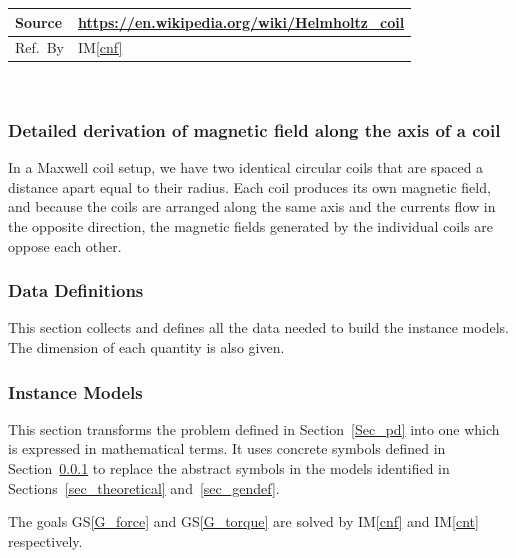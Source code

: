 \documentclass[12pt]{article}
\newcommand{\colAwidth}{0.13\textwidth}
\newcommand{\colBwidth}{0.92\textwidth}
\newcommand{\gsref}[1]{GS\ref{#1}}
\newcommand{\iref}[1]{IM\ref{#1}}
\begin{document}
\begin{minipage}{\textwidth}
\begin{tabular}{| p{\colAwidth} | p{\colBwidth}|}
\\
\hline
  Source & \url{https://en.wikipedia.org/wiki/Helmholtz_coil} \\
  \hline
  Ref.\ By & \iref{cnf}\\
  \hline
\end{tabular}
\end{minipage}\\

\subsubsection*{Detailed derivation of magnetic field along the axis of a coil }
In a Maxwell coil setup, we have two identical circular coils that are spaced a distance apart equal to their radius. Each coil produces its own magnetic field, and because the coils are arranged along the same axis and the currents flow in the opposite direction, the magnetic fields generated by the individual coils are oppose each other.

\subsubsection{Data Definitions}\label{sec_datadef}

This section collects and defines all the data needed to build the instance
models. The dimension of each quantity is also given. 
~\newline

\subsubsection{Instance Models} \label{sec_instance}    

This section transforms the problem defined in Section~\ref{Sec_pd} into 
one which is expressed in mathematical terms. It uses concrete symbols defined 
in Section~\ref{sec_datadef} to replace the abstract symbols in the models 
identified in Sections~\ref{sec_theoretical} and~\ref{sec_gendef}.

The goals \gsref{G_force} and \gsref{G_torque} are solved by \iref{cnf} and \iref{cnt} respectively.

~\newline

\end{document}

